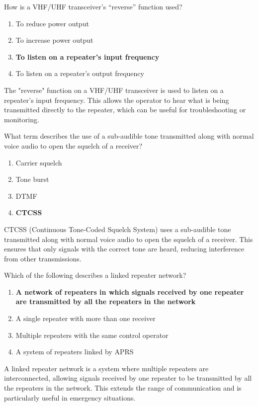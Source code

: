 
\begin{tcolorbox}[colback=gray!10!white,colframe=black!75!black,title={T2B01}]
    How is a VHF/UHF transceiver’s “reverse” function used?
    \begin{enumerate}[label=\Alph*,noitemsep]
        \item To reduce power output
        \item To increase power output
        \item \textbf{To listen on a repeater’s input frequency}
        \item To listen on a repeater’s output frequency
    \end{enumerate}
\end{tcolorbox}
The "reverse" function on a VHF/UHF transceiver is used to listen on a repeater's input frequency. This allows the operator to hear what is being transmitted directly to the repeater, which can be useful for troubleshooting or monitoring.


\begin{tcolorbox}[colback=gray!10!white,colframe=black!75!black,title={T2B02}]
    What term describes the use of a sub-audible tone transmitted along with normal voice audio to open the squelch of a receiver?
    \begin{enumerate}[label=\Alph*,noitemsep]
        \item Carrier squelch
        \item Tone burst
        \item DTMF
        \item \textbf{CTCSS}
    \end{enumerate}
\end{tcolorbox}
CTCSS (Continuous Tone-Coded Squelch System) uses a sub-audible tone transmitted along with normal voice audio to open the squelch of a receiver. This ensures that only signals with the correct tone are heard, reducing interference from other transmissions.


\begin{tcolorbox}[colback=gray!10!white,colframe=black!75!black,title={T2B03}]
    Which of the following describes a linked repeater network?
    \begin{enumerate}[label=\Alph*,noitemsep]
        \item \textbf{A network of repeaters in which signals received by one repeater are transmitted by all the repeaters in the network}
        \item A single repeater with more than one receiver
        \item Multiple repeaters with the same control operator
        \item A system of repeaters linked by APRS
    \end{enumerate}
\end{tcolorbox}
A linked repeater network is a system where multiple repeaters are interconnected, allowing signals received by one repeater to be transmitted by all the repeaters in the network. This extends the range of communication and is particularly useful in emergency situations.

